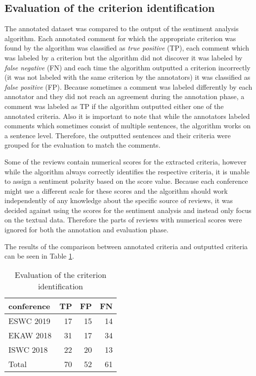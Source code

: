\subsection{Evaluation of the criterion identification}
The annotated dataset was compared to the output of the sentiment analysis algorithm. 
Each annotated comment for which the appropriate criterion was found by the algorithm was classified as \textit{true positive} (TP), each comment which was labeled by a criterion but the algorithm did not discover it was labeled by \textit{false negative} (FN) and each time the algorithm outputted a criterion incorrectly (it was not labeled with the same criterion by the annotators) it was classified as \textit{false positive} (FP). Because sometimes a comment was labeled differently by each annotator and they did not reach an agreement during the annotation phase, a comment was labeled as TP if the algorithm outputted either one of the annotated criteria. Also it is important to note that while the annotators labeled comments which sometimes consist of multiple sentences, the algorithm works on a sentence level. Therefore, the outputted sentences and their criteria were grouped for the evaluation to match the comments.

Some of the reviews contain numerical scores for the extracted criteria, however while the algorithm always correctly identifies the respective criteria, it is unable to assign a sentiment polarity based on the score value. Because each conference might use a different scale for these scores and the algorithm should work independently of any knowledge about the specific source of reviews, it was decided against using the scores for the sentiment analysis and instead only focus on the textual data. Therefore the parts of reviews with numerical scores were ignored for both the annotation and evaluation phase.

 The results of the comparison between annotated criteria and outputted criteria can be seen in Table \ref{tab:eval_ae}.
\begin{table}[htb!]
\caption{Evaluation of the criterion identification}
\label{tab:eval_ae}
\centering

\begin{tabular}{l|rrr}
\textbf{conference} & \textbf{TP} & \textbf{FP} & \textbf{FN} \\ \hline
ESWC 2019           & 17          & 15          & 14          \\
EKAW 2018           & 31          & 17          & 34          \\
ISWC 2018           & 22          & 20          & 13          \\ \hline
Total               & 70          & 52          & 61         
\end{tabular}
\end{table}

